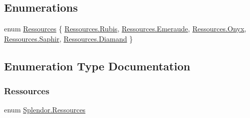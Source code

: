 \subsection*{Enumerations}
\begin{DoxyCompactItemize}
\item 
enum \hyperlink{namespace_splendor_abc955fe800ad5f701f777df0a2a29dc2}{Ressources} \{ \newline
\hyperlink{namespace_splendor_abc955fe800ad5f701f777df0a2a29dc2a325687fe48a90ae4d55ca5c97df8cafc}{Ressources.\+Rubis}, 
\hyperlink{namespace_splendor_abc955fe800ad5f701f777df0a2a29dc2af88606526c0a5ccc3d5fa2665723f262}{Ressources.\+Emeraude}, 
\hyperlink{namespace_splendor_abc955fe800ad5f701f777df0a2a29dc2aa92f2418fb7a402879ffa1127f6bc408}{Ressources.\+Onyx}, 
\hyperlink{namespace_splendor_abc955fe800ad5f701f777df0a2a29dc2ab4c3620381991c7f803f9f0beef133e7}{Ressources.\+Saphir}, 
\newline
\hyperlink{namespace_splendor_abc955fe800ad5f701f777df0a2a29dc2aaf25488f58f7ac25bd60be893e7c3cd1}{Ressources.\+Diamand}
 \}
\end{DoxyCompactItemize}


\subsection{Enumeration Type Documentation}
\mbox{\label{namespace_splendor_abc955fe800ad5f701f777df0a2a29dc2}} 
\subsubsection{\texorpdfstring{Ressources}{Ressources}}
{\footnotesize\ttfamily enum \hyperlink{namespace_splendor_abc955fe800ad5f701f777df0a2a29dc2}{Splendor.\+Ressources}\hspace{0.3cm}{\ttfamily [strong]}}

